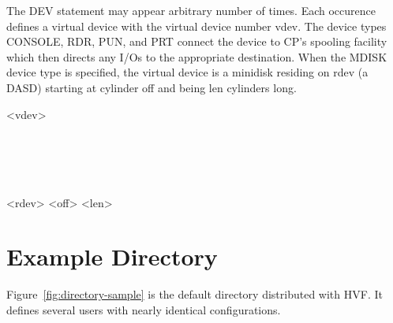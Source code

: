 The DEV statement may appear arbitrary number of times.  Each occurence
defines a virtual device with the virtual device number vdev.  The device
types CONSOLE, RDR, PUN, and PRT connect the device to CP's spooling
facility which then directs any I/Os to the appropriate destination.  When
the MDISK device type is specified, the virtual device is a minidisk
residing on rdev (a DASD) starting at cylinder off and being len cylinders
long.

\begin{syntdiag}
 <vdev>
\begin{stack}
	 \\
	 \\
	 \\
	 \\
	 <rdev> <off> <len>
\end{stack}
\end{syntdiag}

\section{Example Directory}
Figure~\ref{fig:directory-sample} is the default directory distributed with
HVF.  It defines several users with nearly identical configurations.

\begin{figure*}[htb]
\small

\captionfont
\caption{\capfont Example directory defining three users.}
\label{fig:directory-sample}
\end{figure*}

